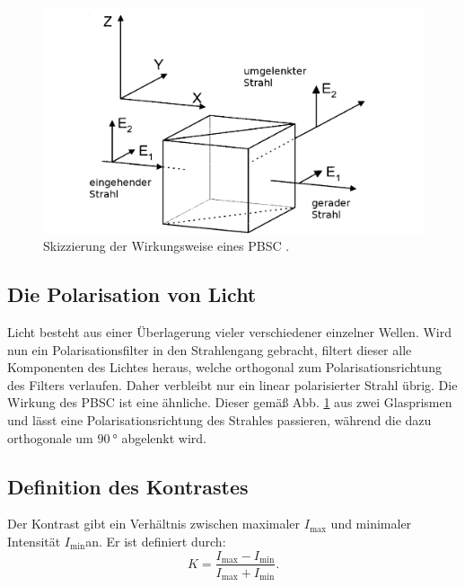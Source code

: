 \begin{figure}
	\centering
	\includegraphics[width=\linewidth-100pt,height=\textheight-100pt,keepaspectratio]{content/Bilder/PBSC.png}
	\caption{Skizzierung der Wirkungsweise eines PBSC \cite{V64}.}
	\label{fig:PBSC}
\end{figure}


\subsection{Die Polarisation von Licht}
Licht besteht aus einer Überlagerung vieler verschiedener einzelner Wellen. Wird nun ein Polarisationsfilter in den Strahlengang gebracht, filtert dieser alle Komponenten des Lichtes heraus, welche orthogonal zum Polarisationsrichtung des Filters verlaufen. Daher verbleibt nur ein linear polarisierter Strahl übrig. Die Wirkung des PBSC ist eine ähnliche. Dieser gemäß Abb. \ref{fig:PBSC} aus zwei Glasprismen und lässt eine Polarisationsrichtung des Strahles passieren, während die dazu orthogonale um $\SI{90}{\degree}$ abgelenkt wird.

\subsection{Definition des Kontrastes}
Der Kontrast gibt ein Verhältnis zwischen maximaler $I_\text{max}$ und minimaler Intensität $I_\text{min}$an. Er ist definiert durch:
\begin{equation}
    K = \frac{I_\text{max} - I_\text{min}}{I_\text{max} + I_\text{min}} \text{.}          \label{eq:kont}
\end{equation}